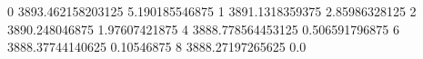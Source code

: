 0 3893.462158203125 5.190185546875
1 3891.1318359375 2.85986328125
2 3890.248046875 1.97607421875
4 3888.778564453125 0.506591796875
6 3888.37744140625 0.10546875
8 3888.27197265625 0.0
